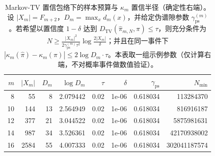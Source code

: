 \begin{table}[H]
\centering
\scriptsize
\setlength{\tabcolsep}{5pt}
\caption{Markov-TV 置信包络下的样本预算与 $\kappa_m$ 置信半径（确定性右端）。设 $|X_m|=F_{m+2}$，$D_m=\max_x d_m(x)$，并给定伪谱隙参数 $\gamma^{(m)}_{\mathrm{ps}}$。若希望以置信度 $1-\delta$ 达到 $D_{\mathrm{TV}}(\hat\pi_{m,N},\pi)\le \tau$，则充分条件为 $N\ge \frac{|X_m|^2}{2\gamma^{(m)}_{\mathrm{ps}}\tau^2}\log\frac{2|X_m|}{\delta}$；并且在同一事件下 $|\kappa_m(\hat\pi)-\kappa_m(\pi)|\le 2\log D_m\cdot \tau$。本表取一组示例参数（仅计算右端，不对概率事件做数值验证）。}
\label{tab:fold_kappa_tv_budget}
\begin{tabular}{r r r r r r r r}
\toprule
$m$ & $|X_m|$ & $D_m$ & $\log D_m$ & $\tau$ & $\delta$ & $\gamma_{\mathrm{ps}}$ & $N_{\min}$\\
\midrule
8 & 55 & 8 & 2.079442 & 0.02 & 1e-06 & 0.618034 & 113284370\\
10 & 144 & 13 & 2.564949 & 0.02 & 1e-06 & 0.618034 & 816916187\\
12 & 377 & 21 & 3.044522 & 0.02 & 1e-06 & 0.618034 & 5875981631\\
14 & 987 & 34 & 3.526361 & 0.02 & 1e-06 & 0.618034 & 42170938002\\
16 & 2584 & 55 & 4.007333 & 0.02 & 1e-06 & 0.618034 & 302041187574\\
\bottomrule
\end{tabular}
\end{table}
